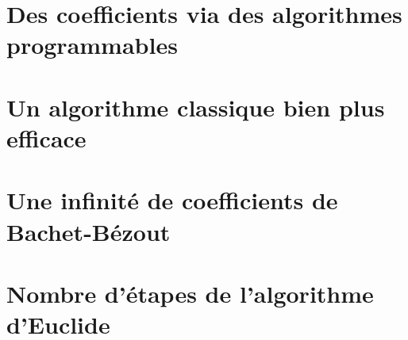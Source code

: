 \documentclass{amsart}
\newcommand\bb{Bachet-Bézout}
\begin{document}
\newpage
\section{Des coefficients via des algorithmes programmables}






\newpage
\section{Un algorithme classique bien plus efficace}






\newpage
\section{Une infinité de coefficients de \bb}






\newpage
\section{Nombre d'étapes de l'algorithme d'Euclide} \label{euclide-complexity}


\end{document}
